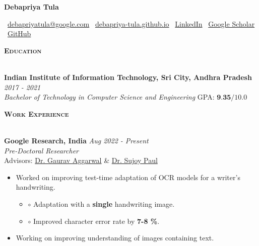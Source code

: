 \documentclass[10pt]{article}
\renewcommand{\section}[1]{
\bigskip
  \begin{Large}
  {\textsc{\textbf{#1}}}
  \end{Large}
  \hrulefill
  \medskip
  \\
}
\newenvironment{innerlist}[1][\enskip\textbullet]%
        {\begin{itemize}[#1,leftmargin=*,parsep=0pt,itemsep=0pt,topsep=0pt,partopsep=0pt]}
        {\end{itemize}\vspace{-.1\baselineskip}}
\newenvironment{midlist}[1][\enskip\textbullet]%
        {\begin{itemize}[#1,leftmargin=*,parsep=0pt,itemsep=2pt,topsep=0pt,partopsep=0pt]}
        {\end{itemize}}
\providecommand*\email[1]{\href{mailto:#1}{#1}}
\newcommand{\homepage}{https://debapriya-tula.github.io/}
\begin{document}
\begin{LARGE}
\begin{center}\textbf{Debapriya Tula}\end{center}
\end{LARGE}
\smallskip 
\faEnvelope~\email{debapriyatula@google.com} \hfill
\faHome~\href{\homepage}{debapriya-tula.github.io} \hfill
\faLinkedin~\href{http://linkedin.com/in/debapriya-tula}{LinkedIn} \hfill
\faGraduationCap~\href{https://scholar.google.com/citations?view_op=list_works&hl=en&authuser=3&user=4lJhtPYAAAAJ}{Google Scholar} \hfill
\faGithub~\href{http://github.com/Debapriya-Tula}{GitHub} \hfill


\section{Education}
\textbf{Indian Institute of Information Technology, Sri City, Andhra Pradesh} \hfill {\textit{2017 - 2021}}\\
\emph{Bachelor of Technology in Computer Science and Engineering} \hfill{GPA: $\textbf{9.35}/10.0$}

        
\section{Work Experience}
\textbf{Google Research, India} \hfill {\textit{Aug 2022 - Present}}\\
\emph{Pre-Doctoral Researcher}\\
Advisors: \href{https://in.linkedin.com/in/gauagg}{Dr. Gaurav Aggarwal} \& \href{https://research.google/people/107637/}{Dr. Sujoy Paul}
\begin{midlist}
\item Worked on improving test-time adaptation of OCR models for a writer’s handwriting.
    \begin{innerlist}
        \item[$\circ$] Adaptation with a \textbf{single} handwriting image.
        \item[$\circ$] Improved character error rate by \textbf{7-8 \%}.
    \end{innerlist}
\item Working on improving understanding of images containing text.
\end{midlist}
\vspace{2.5mm}
        
\end{document}
